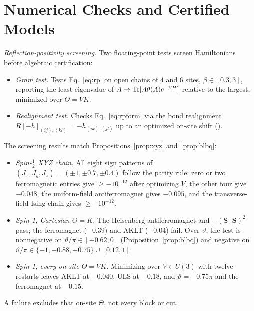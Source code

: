\documentclass[aps,prl,reprint,amsmath,amssymb,nofootinbib,raggedbottom]{revtex4-2}
\begin{document}
\section{Numerical Checks and Certified Models}\label{app:checks}
\emph{Reflection-positivity screening.}
Two floating-point tests screen Hamiltonians before algebraic certification:
\begin{itemize}
\item \emph{Gram test.} Tests Eq.~\eqref{eq:rp} on open chains of $4$ and $6$
sites, $\beta\in[0.3,3]$, reporting the least eigenvalue of
$A\mapsto\operatorname{Tr}[A\theta(A)e^{-\beta H}]$ relative to the largest, minimized over
$\Theta=VK$.
\item \emph{Realignment test.} Checks Eq.~\eqref{eq:rpform} via the bond
realignment $R[-h]_{(ij),(kl)}=-h_{(ik),(jl)}$ up to an optimized on-site shift
().
\end{itemize}
The screening results match Propositions~\ref{prop:xyz} and~\ref{prop:blbq}:
\begin{itemize}
\item \emph{Spin-$\tfrac12$ XYZ chain.} All eight sign patterns of
$(J_x,J_y,J_z)=(\pm1,\pm0.7,\pm0.4)$ follow the parity rule: zero or two
ferromagnetic entries give $\ge-10^{-12}$ after optimizing $V$, the other four
give $-0.048$, the uniform-field antiferromagnet gives $-0.095$, and the
transverse-field Ising chain gives $\ge-10^{-12}$.
\item \emph{Spin-1, Cartesian $\Theta=K$.} The Heisenberg antiferromagnet and
$-(\bm S\cdot\bm S)^2$ pass; the ferromagnet ($-0.39$) and AKLT ($-0.04$) fail.
Over $\vartheta$, the test is nonnegative on $\vartheta/\pi\in[-0.62,0]$
(Proposition~\ref{prop:blbq}) and negative on
$\vartheta/\pi\in\{-1,-0.88,-0.75\}\cup[0.12,1]$.
\item \emph{Spin-1, every on-site $\Theta=VK$.} Minimizing over $V\in U(3)$
with twelve restarts leaves AKLT at $-0.040$, ULS at $-0.18$, and
$\vartheta=-0.75\pi$ and the ferromagnet at $-0.15$.
\end{itemize}
A failure excludes that on-site $\Theta$, not every block or cut.
\end{document}
